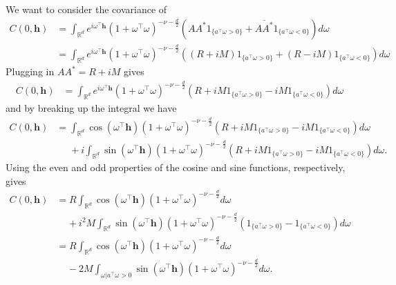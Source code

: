 \documentclass[11pt]{article}
\begin{document}
We want to consider the covariance of \begin{align*}
C(0, \boldsymbol{h}) &= \int_{\mathbb{R}^d} e^{i \omega^\top \boldsymbol{h}} (1 + \omega^\top \omega)^{-\nu- \frac{d}{2}} \left(AA^* 1_{\{a^\top \omega > 0\}} + \overline{AA^*} 1_{\{a^\top\omega < 0\}}\right) d\omega \\
&=\int_{\mathbb{R}^d} e^{i \omega^\top \boldsymbol{h}}(1 + \omega^\top \omega)^{-\nu- \frac{d}{2}} \left((R + iM)1_{\{a^\top\omega > 0\}} + (R - iM) 1_{\{a^\top\omega < 0\}}\right) d\omega \end{align*}
Plugging in $AA^* = R + iM$ gives
\begin{align*}
C(0, \boldsymbol{h})&=\int_{\mathbb{R}^d} e^{i \omega^\top \boldsymbol{h}}(1 + \omega^\top \omega)^{-\nu- \frac{d}{2}} \left(R + iM1_{\{a^\top\omega > 0\}}  - iM1_{\{a^\top\omega < 0\}}\right) d\omega\end{align*}
and by breaking up the integral we have
\begin{align*}
C(0, \boldsymbol{h})%
&=\int_{\mathbb{R}^d}\cos(\omega^\top \boldsymbol{h})(1 + \omega^\top \omega)^{-\nu- \frac{d}{2}} \left(R + iM1_{\{a^\top\omega > 0\}}  - iM1_{\{a^\top\omega < 0\}}\right) d\omega \\
&\ \ \ \ \ \ +i\int_{\mathbb{R}^d}\sin(\omega^\top \boldsymbol{h})(1 + \omega^\top \omega)^{-\nu- \frac{d}{2}} \left(R + iM1_{\{a^\top\omega > 0\}}  - iM1_{\{a^\top\omega < 0\}}\right) d\omega.\end{align*}
Using the even and odd properties of the cosine and sine functions, respectively, gives
\begin{align*}
C(0, \boldsymbol{h})&=R\int_{\mathbb{R}^d}\cos(\omega^\top \boldsymbol{h})(1 + \omega^\top \omega)^{-\nu- \frac{d}{2}} d\omega \\
& \ \ \ \ \ + i^2M\int_{\mathbb{R}^d}\sin(\omega^\top \boldsymbol{h})(1 + \omega^\top \omega)^{-\nu- \frac{d}{2}} \left(1_{\{a^\top\omega > 0\}}  - 1_{\{a^\top\omega < 0\}}\right) d\omega \\
&=R\int_{\mathbb{R}^d}\cos(\omega^\top \boldsymbol{h})(1 + \omega^\top \omega)^{-\nu- \frac{d}{2}} d\omega \\
& \ \ \ \ \ -2M\int_{\omega | a^\top\omega > 0}\sin(\omega^\top \boldsymbol{h})(1 + \omega^\top \omega)^{-\nu- \frac{d}{2}} d\omega .%
\end{align*}%
\end{document}
